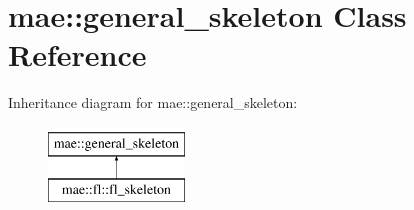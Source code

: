 \hypertarget{classmae_1_1general__skeleton}{\section{mae\-:\-:general\-\_\-skeleton Class Reference}
\label{classmae_1_1general__skeleton}
}
Inheritance diagram for mae\-:\-:general\-\_\-skeleton\-:\begin{figure}[H]
\begin{center}
\leavevmode
\includegraphics[height=2.000000cm]{classmae_1_1general__skeleton}
\end{center}
\end{figure}
